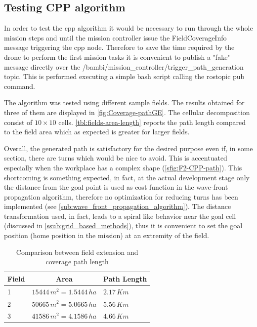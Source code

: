 \subsection{Testing CPP algorithm} %
\label{sub:testing_cpp_algorithm}
In order to test the \acrlong{cpp} algorithm it would be necessary to run through the whole mission steps and until the mission controller issue the \textsf{FieldCoverageInfo} message triggering the \acrshort{cpp} node. Therefore to save the time required by the drone to perform the first mission tasks it is convenient to publish a "fake" message directly over the \textsf{/bambi/mission\_controller/trigger\_path\_generation} topic. This is performed executing a simple bash script calling the \textsf{rostopic pub} command.\par
The algorithm was tested using different sample fields. The results obtained for three of them are displayed in \autoref{fig:Coverage-pathGE}. The cellular decomposition consist of $10 \times 10$ cells. \autoref{tbl:fields-area-length} reports the path length compared to the field area which as expected is greater for larger fields.\par {}
Overall, the generated path is satisfactory for the desired purpose even if, in some section, there are turns which would be nice to avoid. This is accentuated especially when the workplace has a complex shape (\autoref{sfig:F2-CPP-path}). This shortcoming is something expected, in fact, at the actual development stage only the distance from the goal point is used as cost function in the wave-front propagation algorithm, therefore no optimization for reducing turns has been implemented (see \autoref{sub:wave_front_propagation_algorithm}). The distance transformation used, in fact, leads to a spiral like behavior near the goal cell (discussed in \autoref{ssub:grid_based_methods}), thus it is convenient to set the goal position (home position in the mission) at an extremity of the field.


\begin{table}[ht]
\centering
\begin{tabular}{|l|l|l|}
\hline
\multicolumn{1}{|c|}{\textbf{Field}} & \multicolumn{1}{c|}{\textbf{Area}} & \multicolumn{1}{c|}{\textbf{Path Length}} \\ \hline
1                                    & $15444\, m^2=1.5444\, ha$          & $2.17\, Km$                               \\ \hline
2                                    & $50665\, m^2=5.0665\, ha$          & $5.56\, Km$                               \\ \hline
3                                    & $41586\, m^2=4.1586\, ha$          & $4.66\, Km$                               \\ \hline
\end{tabular}
 \caption{Comparison between field extension and coverage path length}
 \label{tbl:fields-area-length}
\end{table}


